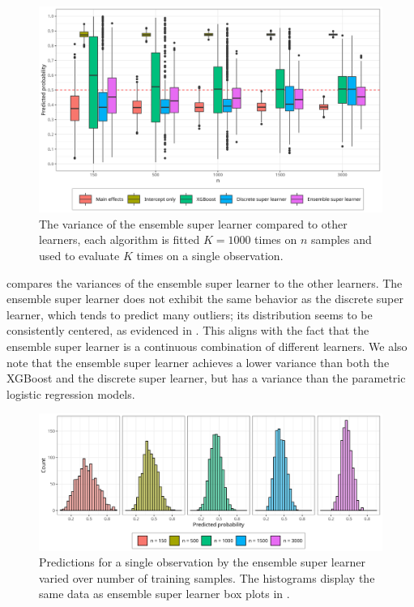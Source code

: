 \documentclass[./main.tex]{subfiles}
\begin{document}
\begin{figure}[H]
    \centering
    \includegraphics[width=\textwidth]{figures/learner_vars_w_esl_1000.png}
    \caption{The variance of the ensemble super learner compared to other learners, each algorithm is fitted $ K = 1000 $ times on $n$ samples and used to evaluate $ K $ times on a single observation.}
    \label{fig:learner_vars_w_esl_1000}
\end{figure}
 compares the variances of the ensemble super learner to the other learners. The ensemble super learner does not exhibit the same behavior as the discrete super learner, which tends to predict many outliers; its distribution seems to be consistently centered, as evidenced in . This aligns with the fact that the ensemble super learner is a continuous combination of different learners. We also note that the ensemble super learner achieves a lower variance than both the XGBoost and the discrete super learner, but has a variance than the parametric logistic regression models. 
\begin{figure}[H]
    \centering
    \includegraphics[width=\textwidth]{figures/hist_esl_dist.png}
    \caption{Predictions for a single observation by the ensemble super learner varied over number of training samples. The histograms display the same data as ensemble super learner box plots in .}
    \label{fig:hist_esl_dist}
\end{figure}
\end{document}
